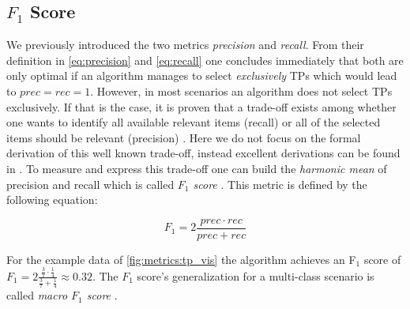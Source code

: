 \subsection{$F_1$ Score}
\label{chp:fundamentals:sec:metrics:subsec:f1_score}

We previously introduced the two metrics \textit{precision} and \textit{recall}.
From their definition in \cref{eq:precision} and \cref{eq:recall} one concludes immediately that both are only optimal if an algorithm manages to select \textit{exclusively} \acp{TP} which would lead to $prec = rec = 1$.
However, in most scenarios an algorithm does not select \acp{TP} exclusively.
If that is the case, it is proven that a trade-off exists among whether one wants to identify all available relevant items (recall) or all of the selected items should be relevant (precision) \parencite{Gordon:1989}.
Here we do not focus on the formal derivation of this well known trade-off, instead excellent derivations can be found in \textcites{Gordon:1989}{Zhu:2004}.
To measure and express this trade-off one can build the \textit{harmonic mean} of precision and recall which is called \textit{$F_1$ score} \parencite{Powers:2011}.
This metric is defined by the following equation:

\begin{equation}\label{eq:f1_score}
    F_1 = 2 \frac{prec \cdot rec}{prec+rec}
\end{equation}

For the example data of \cref{fig:metrics:tp_vis} the algorithm achieves an F$_1$ score of $F_1 = 2 \frac{\frac{3}{7} \cdot \frac{1}{4}}{\frac{3}{7}+\frac{1}{4}} \approx 0.32$.
The $F_1$ score's generalization for a multi-class scenario is called \textit{macro $F_1$ score} \parencite{Opitz:2019}.
